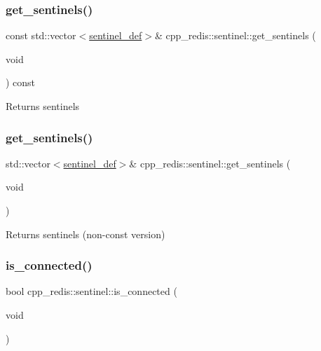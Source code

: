 \subsubsection{\texorpdfstring{get\+\_\+sentinels()}{get\_sentinels()}\hspace{0.1cm}{\footnotesize\ttfamily [1/2]}}
{\footnotesize\ttfamily const std\+::vector$<$\hyperlink{classcpp__redis_1_1sentinel_1_1sentinel__def}{sentinel\+\_\+def}$>$\& cpp\+\_\+redis\+::sentinel\+::get\+\_\+sentinels (\begin{DoxyParamCaption}\item[{void}]{ }\end{DoxyParamCaption}) const}

\begin{DoxyReturn}{Returns}
sentinels 
\end{DoxyReturn}
\mbox{\label{classcpp__redis_1_1sentinel_a62cc14b7795d746cc7d0053c1e0a3abd}} 
\subsubsection{\texorpdfstring{get\+\_\+sentinels()}{get\_sentinels()}\hspace{0.1cm}{\footnotesize\ttfamily [2/2]}}
{\footnotesize\ttfamily std\+::vector$<$\hyperlink{classcpp__redis_1_1sentinel_1_1sentinel__def}{sentinel\+\_\+def}$>$\& cpp\+\_\+redis\+::sentinel\+::get\+\_\+sentinels (\begin{DoxyParamCaption}\item[{void}]{ }\end{DoxyParamCaption})}

\begin{DoxyReturn}{Returns}
sentinels (non-\/const version) 
\end{DoxyReturn}
\mbox{\label{classcpp__redis_1_1sentinel_aa98a0593e6e7c04d8d0dd1f292cdce47}} 
\subsubsection{\texorpdfstring{is\+\_\+connected()}{is\_connected()}}
{\footnotesize\ttfamily bool cpp\+\_\+redis\+::sentinel\+::is\+\_\+connected (\begin{DoxyParamCaption}\item[{void}]{ }\end{DoxyParamCaption})}

